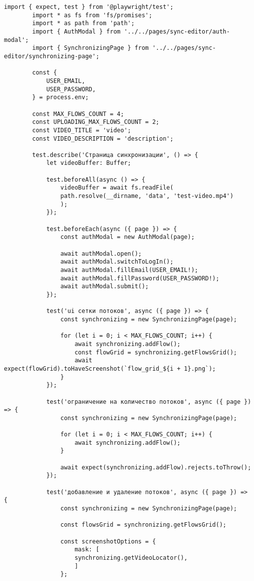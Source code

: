 	\begin{lstlisting}[caption={tests/sync-editor/synchronizing.spec.ts}]
		import { expect, test } from '@playwright/test';
		import * as fs from 'fs/promises';
		import * as path from 'path';
		import { AuthModal } from '../../pages/sync-editor/auth-modal';
		import { SynchronizingPage } from '../../pages/sync-editor/synchronizing-page';
		
		const {
			USER_EMAIL,
			USER_PASSWORD,
		} = process.env;
		
		const MAX_FLOWS_COUNT = 4;
		const UPLOADING_MAX_FLOWS_COUNT = 2;
		const VIDEO_TITLE = 'video';
		const VIDEO_DESCRIPTION = 'description';
		
		test.describe('Страница синхронизации', () => {
			let videoBuffer: Buffer;
			
			test.beforeAll(async () => {
				videoBuffer = await fs.readFile(
				path.resolve(__dirname, 'data', 'test-video.mp4')
				);
			});
			
			test.beforeEach(async ({ page }) => {
				const authModal = new AuthModal(page);
				
				await authModal.open();
				await authModal.switchToLogIn();
				await authModal.fillEmail(USER_EMAIL!);
				await authModal.fillPassword(USER_PASSWORD!);
				await authModal.submit();
			});    
			
			test('ui сетки потоков', async ({ page }) => {
				const synchronizing = new SynchronizingPage(page);
				
				for (let i = 0; i < MAX_FLOWS_COUNT; i++) {
					await synchronizing.addFlow();
					const flowGrid = synchronizing.getFlowsGrid();
					await expect(flowGrid).toHaveScreenshot(`flow_grid_${i + 1}.png`);
				}
			});
			
			test('ограничение на количество потоков', async ({ page }) => {
				const synchronizing = new SynchronizingPage(page);     
				
				for (let i = 0; i < MAX_FLOWS_COUNT; i++) {
					await synchronizing.addFlow();
				}
				
				await expect(synchronizing.addFlow).rejects.toThrow();
			});
			
			test('добавление и удаление потоков', async ({ page }) => {
				const synchronizing = new SynchronizingPage(page);
				
				const flowsGrid = synchronizing.getFlowsGrid();
				
				const screenshotOptions = {
					mask: [
					synchronizing.getVideoLocator(),
					]
				};
				

\end{lstlisting}
